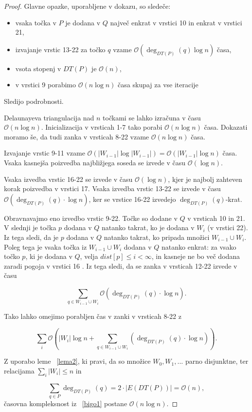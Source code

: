 \documentclass[a4paper, 12pt]{book}
\newcommand{\OO}{\ensuremath{\mathcal{O}}} %
\begin{document}
\begin{proof}
Glavne opazke, uporabljene v dokazu, so sledeče:
\begin{itemize}
\item vsaka točka v $P$ je dodana v $Q$ največ enkrat v vrstici 10 in enkrat v vrstici 21,
\item izvajanje vrstic 13-22 za točko $q$ vzame $\OO(\deg_{DT(P)}(q)\log n)$ časa,
\item vsota stopenj v $DT(P)$ je $\OO(n)$,
\item v vrstici 9 porabimo $\OO(n\log n)$ časa skupaj za vse iteracije
\end{itemize}
Sledijo podrobnosti.

Delaunayeva triangulacija nad $n$ točkami se lahko izračuna v času \\ $\OO(n\log n)$. Inicializacija v vrsticah 1-7 tako porabi $\OO(n\log n)$ časa. Dokazati moramo še, da tudi zanka v vrsticah 8-22 vzame $\OO(n\log n)$ časa.

Izvajanje vrstic 9-11 vzame $\OO(|W_{i-1}|\log |W_{i-1}|) = \OO(|W_{i-1}|\log n)$ časa. Vsaka kasnejša poizvedba najbližjega soseda se izvede v času $\OO(\log n)$.

Vsaka izvedba vrstic 16-22 se izvede v času $\OO(\log n)$, kjer je najbolj zahteven korak poizvedba v vrstici 17. Vsaka izvedba vrstic 13-22 se izvede v času $\OO(\deg_{DT(P)}(q)\cdot\log n)$, ker se vrstice 16-22 izvedejo $\deg_{DT(P)}(q)$-krat.

Obravnavajmo eno izvedbo vrstic 9-22. Točke so dodane v $Q$ v vrsticah 10 in 21. V slednji je točka $p$ dodana v $Q$ natanko takrat, ko je dodana v $W_i$ (v vrstici 22). Iz tega sledi, da je $p$ dodana v $Q$ natanko takrat, ko pripada množici $W_{i-1}\cup W_i$. Poleg tega je vsaka točka iz $W_{i-1}\cup W_i$ dodana v $Q$ natanko enkrat: za vsako točko $p$, ki je dodana v $Q$, velja $dist[p]\leq i < \infty$, in kasneje ne bo več dodana zaradi pogoja v vrstici 16
. Iz tega sledi, da se zanka v vrsticah 12-22 izvede v času

\begin{equation}
\sum_{q\in W_{i-1}\cup W_i} \OO(\deg_{DT(P)}(q) \cdot \log n).
\end{equation}

Tako lahko omejimo porabljen čas v zanki v vrsticah 8-22 z

\begin{equation}
\label{bigo1}
\sum_i \OO \left( |W_i|\log n + \sum_{q\in W_{i-1}\cup W_i} (\deg_{DT(P)}(q) \cdot \log n) \right) .
\end{equation}

Z uporabo leme ~\ref{lema2}, ki pravi, da so množice $W_0,W_1,...$ parno disjunktne, ter relacijama $\sum_i |W_i| \leq n$ in 

\begin{equation}
\sum_{q \in P} \deg_{DT(P)}(q) = 2 \cdot |E(DT(P))| = \OO(n),
\end{equation}
časovna kompleksnost iz ~\ref{bigo1} postane $\OO(n\log n)$.
\end{proof}
\end{document}
